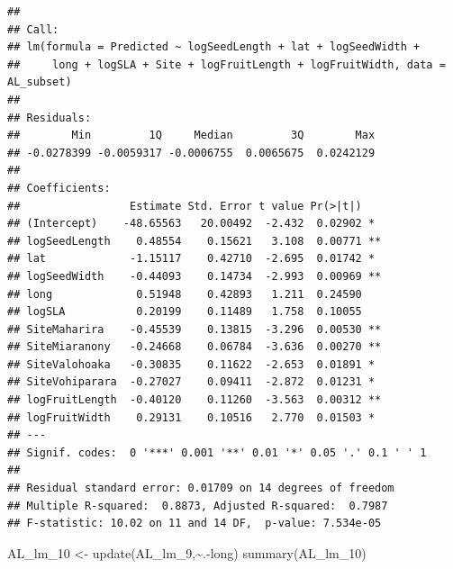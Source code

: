 \documentclass[
  12pt,
]{article}
\newenvironment{Shaded}{\begin{snugshade}}{\end{snugshade}}
\newcommand{\FunctionTok}[1]{\textcolor[rgb]{0.00,0.00,0.00}{#1}}
\newcommand{\NormalTok}[1]{#1}
\newcommand{\OtherTok}[1]{\textcolor[rgb]{0.56,0.35,0.01}{#1}}
\newcommand{\SpecialCharTok}[1]{\textcolor[rgb]{0.00,0.00,0.00}{#1}}
\begin{document}
\begin{verbatim}
## 
## Call:
## lm(formula = Predicted ~ logSeedLength + lat + logSeedWidth + 
##     long + logSLA + Site + logFruitLength + logFruitWidth, data = AL_subset)
## 
## Residuals:
##        Min         1Q     Median         3Q        Max 
## -0.0278399 -0.0059317 -0.0006755  0.0065675  0.0242129 
## 
## Coefficients:
##                 Estimate Std. Error t value Pr(>|t|)   
## (Intercept)    -48.65563   20.00492  -2.432  0.02902 * 
## logSeedLength    0.48554    0.15621   3.108  0.00771 **
## lat             -1.15117    0.42710  -2.695  0.01742 * 
## logSeedWidth    -0.44093    0.14734  -2.993  0.00969 **
## long             0.51948    0.42893   1.211  0.24590   
## logSLA           0.20199    0.11489   1.758  0.10055   
## SiteMaharira    -0.45539    0.13815  -3.296  0.00530 **
## SiteMiaranony   -0.24668    0.06784  -3.636  0.00270 **
## SiteValohoaka   -0.30835    0.11622  -2.653  0.01891 * 
## SiteVohiparara  -0.27027    0.09411  -2.872  0.01231 * 
## logFruitLength  -0.40120    0.11260  -3.563  0.00312 **
## logFruitWidth    0.29131    0.10516   2.770  0.01503 * 
## ---
## Signif. codes:  0 '***' 0.001 '**' 0.01 '*' 0.05 '.' 0.1 ' ' 1
## 
## Residual standard error: 0.01709 on 14 degrees of freedom
## Multiple R-squared:  0.8873, Adjusted R-squared:  0.7987 
## F-statistic: 10.02 on 11 and 14 DF,  p-value: 7.534e-05
\end{verbatim}

\begin{Shaded}
\begin{Highlighting}[]
\NormalTok{AL\_lm\_10 }\OtherTok{\textless{}{-}} \FunctionTok{update}\NormalTok{(AL\_lm\_9,}\SpecialCharTok{\textasciitilde{}}\NormalTok{.}\SpecialCharTok{{-}}\NormalTok{long)}
\FunctionTok{summary}\NormalTok{(AL\_lm\_10)}
\end{Highlighting}
\end{Shaded}
\end{document}
